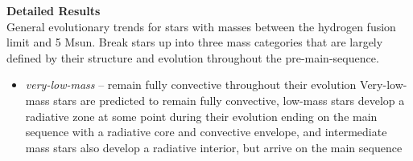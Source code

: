\textbf{Detailed Results} \\
General evolutionary trends for stars with masses between the hydrogen fusion limit and 5 Msun. Break stars up into three mass categories that are largely defined by their structure and evolution throughout the pre-main-sequence. 
\begin{itemize}
 \item[] {\it very-low-mass} -- remain fully convective throughout their evolution
Very-low-mass stars are predicted to remain fully convective, 
low-mass stars develop a radiative zone at some point during their evolution ending on the main sequence with a radiative core and convective envelope, and intermediate mass stars also develop a radiative interior, but arrive on the main sequence
\end{itemize}